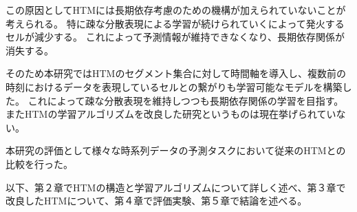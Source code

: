 この原因としてHTMには長期依存考慮のための機構が加えられていないことが考えられる。
特に疎な分散表現による学習が続けられていくによって発火するセルが減少する。
これによって予測情報が維持できなくなり、長期依存関係が消失する。

そのため本研究ではHTMのセグメント集合に対して時間軸を導入し、複数前の時刻におけるデータを表現しているセルとの繋がりも学習可能なモデルを構築した。
これによって疎な分散表現を維持しつつも長期依存関係の学習を目指す。
またHTMの学習アルゴリズムを改良した研究というものは現在挙げられていない。

本研究の評価として様々な時系列データの予測タスクにおいて従来のHTMとの比較を行った。

以下、第２章でHTMの構造と学習アルゴリズムについて詳しく述べ、第３章で改良したHTMについて、第４章で評価実験、第５章で結論を述べる。
